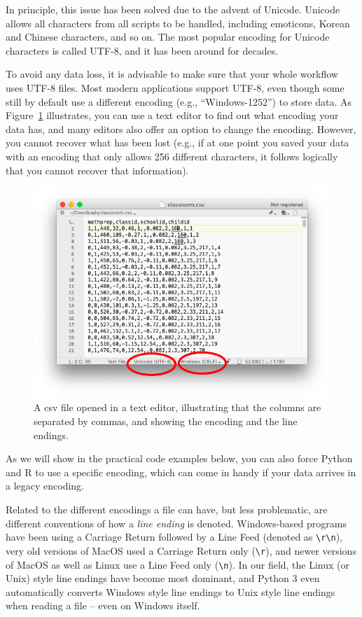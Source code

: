 In principle, this issue has been solved due to the advent of Unicode. Unicode allows all characters from all scripts to be handled, including emoticons, Korean and Chinese characters, and so on. The most popular encoding for Unicode characters is called UTF-8, and it has been around for decades.

To avoid any data loss, it is advisable to make sure that your whole workflow uses UTF-8 files. Most modern applications support UTF-8, even though some still by default use a different encoding (e.g., ``Windows-1252'') to store data. As Figure~\ref{fig:csv-in-editor} illustrates, you can use a text editor to find out what encoding your data has, and many editors also offer an option to change the encoding. However, you cannot recover what has been lost (e.g., if at one point you saved your data with an encoding that only allows 256 different characters, it follows logically that you cannot recover that information).


\begin{figure}
\centering
\includegraphics[width=0.9\linewidth]{figures/ch6_csv-in-editor}
\caption{A csv file opened in a text editor, illustrating that the columns are separated by commas, and showing the encoding and the line endings.}
\label{fig:csv-in-editor}
\end{figure}

As we will show in the practical code examples below, you can also force Python and R to use a specific encoding, which can come in handy if your data arrives in a legacy encoding.

Related to the different encodings a file can have, but less problematic, are different conventions of how a \emph{line ending} is denoted. Windows-based programs have been using a Carriage Return followed by a Line Feed (denoted as \texttt{\textbackslash r\textbackslash n}), very old versions of MacOS used a Carriage Return only (\texttt{\textbackslash r}), and newer versions of MacOS as well as Linux use a Line Feed only (\texttt{\textbackslash n}). In our field, the Linux (or Unix) style line endings have become most dominant, and Python 3 even automatically converts Windows style line endings to Unix style line endings when reading a file -- even on Windows itself.


